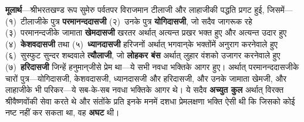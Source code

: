 \begin{sloppypar}\justifying{}
\textbf{मूलार्थ}—श्रीभरतखण्ड रूप सुमेरु पर्वतपर विराजमान टीलाजी और लाहाजीकी पद्धति प्रगट हुई, जिसमें—(१)~टीलाजीके पुत्र \textbf{परमानन्द\-दासजी} (२)~उनके पुत्र \textbf{योगिदासजी}, जो सदैव जागरूक रहे (३)~परमानन्दजीके जामाता \textbf{खेमदासजी} खरतर अर्थात् अत्यन्त प्रखर भक्त हुए और अत्यन्त उदार हुए (४)~\textbf{केशवदासजी} तथा (५)~\textbf{ध्यानदासजी} हरिजनों अर्थात् भगवान्‌के भक्तोंमें अनुराग करनेवाले हुए (६)~सुस्फुट सुन्दर शब्दवाले \textbf{त्यौलाजी}, जो \textbf{लोहकर बंस} अर्थात् लुहार वंशको उजागर करनेवाले हुए (७)~\textbf{हरिदासजी} जिन्हें हनुमान्‌जीसे प्रेम था—ये सभी नवधा भक्तिके आगर हुए। अर्थात् परमानन्द\-दासजीके चारों पुत्र—योगिदासजी, केशवदासजी, ध्यानदासजी और हरिदासजी, और उनके जामाता खेमजी, और लाहाजीके भी परिकर—ये सब-के-सब नवधा भक्तिके आगर थे। ये सदैव \textbf{अच्युत कुल} अर्थात् विरक्त श्रीवैष्णवोंकी सेवा करते थे और संतोंके प्रति इनके मनमें दशधा प्रेमलक्षणा भक्ति ऐसी थी कि जिसको कोई नष्ट नहीं कर सकता था, वह \textbf{अघट} थी।
\end{sloppypar}


